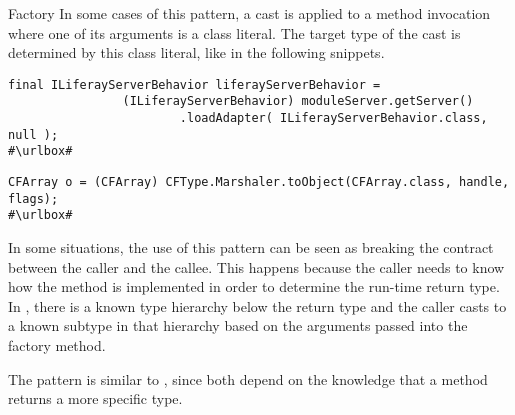 \begin{pattern}{Factory}
In some cases of this pattern, a cast is applied to a method invocation where one of its arguments is a class literal.
The target type of the cast is determined by this class literal,
like in the following snippets.
\def\urlvar{http://bit.ly/liferay_liferay_ide_2FMG0f6}
\begin{verbatim}
final ILiferayServerBehavior liferayServerBehavior =
                (ILiferayServerBehavior) moduleServer.getServer()
                        .loadAdapter( ILiferayServerBehavior.class, null );
#\urlbox#
\end{verbatim}

\def\urlvar{http://bit.ly/robovm_robovm_2FMFWvS}
\begin{verbatim}
CFArray o = (CFArray) CFType.Marshaler.toObject(CFArray.class, handle, flags);
#\urlbox#
\end{verbatim} 


\discussion{}
In some situations, the use of this pattern can be seen as breaking the contract \api{} between the caller and the callee.
This happens because the caller needs to know how the method is implemented in order to determine the run-time return type.
In \thisp{}, there is a known type hierarchy 
below the return type and the caller casts to a known subtype
in that hierarchy based on the arguments passed into the factory method.

The  pattern is similar to \thisp{},
since both depend on the knowledge that a method returns a more specific type.

\end{pattern}
